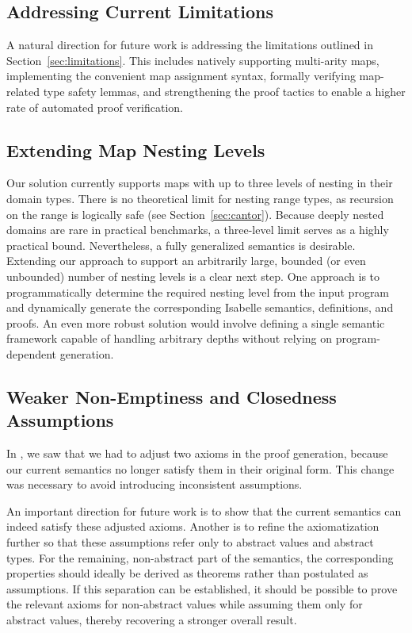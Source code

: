 \subsection{Addressing Current Limitations}

A natural direction for future work is addressing the limitations outlined in Section~\ref{sec:limitations}.
This includes natively supporting multi-arity maps, implementing the convenient map assignment syntax,
formally verifying map-related type safety lemmas,
and strengthening the  proof tactics to enable a higher rate of automated proof verification.

\subsection{Extending Map Nesting Levels}

Our solution currently supports maps with up to three levels of nesting in their domain types.
There is no theoretical limit for nesting range types, as recursion on the range is logically safe (see Section~\ref{sec:cantor}).
Because deeply nested domains are rare in practical benchmarks, a three-level limit serves as a highly practical bound.
Nevertheless, a fully generalized semantics is desirable.
Extending our approach to support an arbitrarily large, bounded (or even unbounded) number of nesting levels is a clear next step.
One approach is to programmatically determine the required nesting level from the input program
and dynamically generate the corresponding Isabelle semantics, definitions, and proofs.
An even more robust solution would involve defining a single semantic framework capable of handling arbitrary depths without relying on program-dependent generation.


\subsection{Weaker Non-Emptiness and Closedness Assumptions}

In , we saw that we had to adjust two axioms in the proof generation,
because our current semantics no longer satisfy them in their original form.
This change was necessary to avoid introducing inconsistent assumptions.

An important direction for future work is to show that the current semantics can indeed satisfy these adjusted axioms.
Another is to refine the axiomatization further so that these assumptions refer only to abstract values and abstract types.
For the remaining, non-abstract part of the semantics, the corresponding properties should ideally be derived as theorems rather than postulated as assumptions.
If this separation can be established, it should be possible to prove the relevant axioms for non-abstract values
while assuming them only for abstract values, thereby recovering a stronger overall result.


